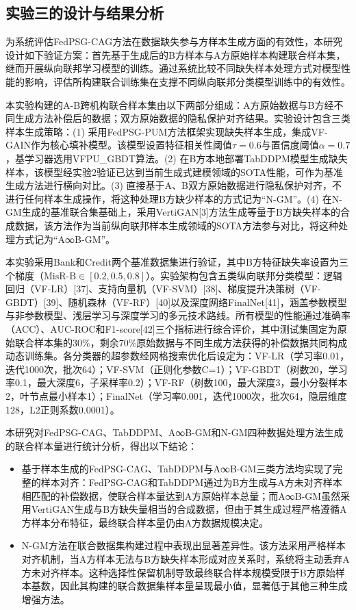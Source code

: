 \subsection{实验三的设计与结果分析}
为系统评估FedPSG-CAG方法在数据缺失参与方样本生成方面的有效性，本研究设计如下验证方案：首先基于生成后的B方样本与A方原始样本构建联合样本集，继而开展纵向联邦学习模型的训练。通过系统比较不同缺失样本处理方式对模型性能的影响，评估所构建联合训练集在支撑不同纵向联邦分类模型训练中的有效性。

本实验构建的A-B跨机构联合样本集由以下两部分组成：A方原始数据与B方经不同生成方法补偿后的数据；双方原始数据的隐私保护对齐结果。实验设计包含三类样本生成策略：(1) 采用FedPSG-PUM方法框架实现缺失样本生成，集成VF-GAIN作为核心填补模型。该模型设置特征相关性阈值$\tau=0.6$与置信度阈值$\alpha=0.7$，基学习器选用VFPU\_GBDT算法。(2) 在B方本地部署TabDDPM模型生成缺失样本，该模型经实验2验证已达到当前生成式建模领域的SOTA性能，可作为基准生成方法进行横向对比。(3) 直接基于A、B双方原始数据进行隐私保护对齐，不进行任何样本生成操作，将这种处理B方缺少样本的方式记为“N-GM”。(4) 在N-GM生成的基准联合集基础上，采用VertiGAN[3]方法生成等量于B方缺失样本的合成数据，该方法作为当前纵向联邦样本生成领域的SOTA方法参与对比，将这种处理方式记为“A∞B-GM”。

本实验采用Bank和Credit两个基准数据集进行验证，其中B方特征缺失率设置为三个梯度（$\text{MisR-B} \in [0.2,0.5,0.8]$）。实验架构包含五类纵向联邦分类模型：逻辑回归（VF-LR）[37]、支持向量机（VF-SVM）[38]、梯度提升决策树（VF-GBDT）[39]、随机森林（VF-RF）[40]以及深度网络FinalNet[41]，涵盖参数模型与非参数模型、浅层学习与深度学习的多元技术路线。所有模型的性能通过准确率（ACC）、AUC-ROC和F1-score[42]三个指标进行综合评价，其中测试集固定为原始联合样本集的30\%，剩余70\%原始数据与不同生成方法获得的补偿数据共同构成动态训练集。各分类器的超参数经网格搜索优化后设定为：VF-LR（学习率0.01，迭代1000次，批次64）；VF-SVM（正则化参数C=1）；VF-GBDT（树数20，学习率0.1，最大深度6，子采样率0.2）；VF-RF（树数100，最大深度3，最小分裂样本2，叶节点最小样本1）；FinalNet（学习率0.001，迭代1000次，批次64，隐层维度128，L2正则系数0.0001）。

本研究对FedPSG-CAG、TabDDPM、A∞B-GM和N-GM四种数据处理方法生成的联合样本量进行统计分析，得出以下结论：

\begin{itemize}
	\item 基于样本生成的FedPSG-CAG、TabDDPM与A∞B-GM三类方法均实现了完整的样本对齐：FedPSG-CAG和TabDDPM通过为B方生成与A方未对齐样本相匹配的补偿数据，使联合样本量达到A方原始样本总量；而A∞B-GM虽然采用VertiGAN生成与B方缺失量相当的合成数据，但由于其生成过程严格遵循A方样本分布特征，最终联合样本量仍由A方数据规模决定。
	
	\item N-GM方法在联合数据集构建过程中表现出显著差异性。该方法采用严格样本对齐机制，当A方样本无法与B方缺失样本形成对应关系时，系统将主动丢弃A方未对齐样本。这种选择性保留机制导致最终联合样本规模受限于B方原始样本基数，因此其构建的联合数据集样本量呈现最小值，显著低于其他三种生成增强方法。
\end{itemize}

